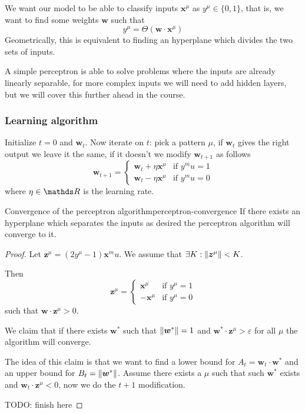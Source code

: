 \documentclass[12pt]{extarticle}
\renewcommand{\vec}[1]{\bm{#1}}
\begin{document}
We want our model to be able to classify inputs $\vec x^\mu$ as $y^\mu \in \{0, 1\}$,
that is, we want to find some weights $\vec w$ such that
\begin{equation}
	y^\mu = \Theta(\vec w \cdot \vec x^\mu)
\end{equation}
Geometrically, this is equivalent to finding an hyperplane which divides the two sets of inputs.

A simple perceptron is able to solve problems where the inputs are already linearly separable,
for more complex inputs we will need to add hidden layers, but we will cover this further
ahead in the course.

\subsubsection{Learning algorithm}

Initialize $t = 0$ and $\vec w_t$.
Now iterate on $t$: pick a pattern $\mu$, if $\vec w_t$ gives the right output we leave it the same,
if it doesn't we modify $\vec w_{t+1}$ as follows
\begin{equation}
	\vec w_{t + 1} = \begin{cases}
		\vec w_t + \eta \vec x^\mu & \text{if } y^mu = 1 \\
		\vec w_t - \eta \vec x^\mu & \text{if } y^mu = 0
	\end{cases}
\end{equation}
where $\eta \in \R$ is the learning rate.

\begin{proposition}{Convergence of the perceptron algorithm}{perceptron-convergence}
	If there exists an hyperplane which separates the inputs as desired
	the perceptron algorithm will converge to it.
\end{proposition}

\begin{proof}
	Let $\vec z^\mu = (2 y^\mu - 1) \vec x^mu$.
	We assume that $\exists K : \norm{\vec z^\mu} < K$.

	Then
	\begin{equation}
		\vec z^\mu = \begin{cases}
			\vec x^\mu  & \text{if }y^\mu = 1 \\
			-\vec x^\mu & \text{if }y^\mu = 0
		\end{cases}
	\end{equation}
	such that $\vec w \cdot \vec z^\mu > 0$.

	We claim that if there exists $\vec w^*$ such that $\norm{\vec w^*} = 1$ and
	$\vec w^* \cdot \vec z^\mu > \varepsilon$ for all $\mu$ the algorithm will converge.

	The idea of this claim is that we want to find a lower bound for $A_t = \vec w_t \cdot \vec w^*$
	and an upper bound for $B_t = \norm{\vec w^*}$.
	Assume there exists a $\mu$ such that such $\vec w^*$ exists and $\vec w_t \cdot \vec z^\mu <0$,
	now we do the $t+1$ modification.

	TODO: finish here
\end{proof}
\end{document}
